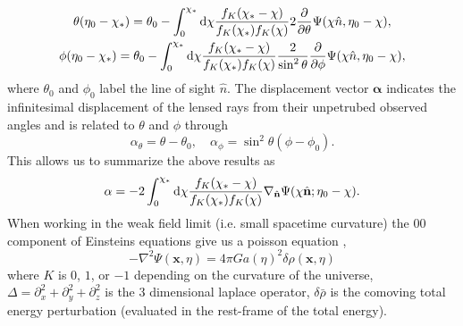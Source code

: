 \documentclass[11pt]{article} %
\DeclareRobustCommand{\d}{\ifmmode\text{d}\else d\fi}
\begin{document}
\begin{gather}
    \theta(\eta_0 - \chi_*)=\theta_0 - \int_0^{\chi_*}\d\chi\frac{f_K(\chi_* - \chi)}{f_K(\chi_*)f_K(\chi)}2\frac{\partial}{\partial \theta}\Psi(\chi\hat n, \eta_0 - \chi),\\
    \phi(\eta_0 - \chi_*)=\theta_0 - \int_0^{\chi_*}\d\chi\frac{f_K(\chi_* - \chi)}{f_K(\chi_*)f_K(\chi)}\frac{2}{\sin^2\theta}\frac{\partial}{\partial \phi}\Psi(\chi\hat n, \eta_0 - \chi),
\end{gather}
where $\theta_0$ and $\phi_0$ label the line of sight $\hat n$. The displacement vector $\mathbf{\alpha}$ indicates the infinitesimal displacement of the lensed rays from their unpetrubed observed angles and is related to $\theta$ and $\phi$ through
$$
\alpha_\theta = \theta - \theta_0, \quad \alpha_\phi = \sin^2\theta(\phi - \phi_0).
$$
This allows us to summarize the above results as
\begin{equation}
    \mathbf \alpha = -2 \int_0^{\chi_*}\d \chi \frac{f_K(\chi_* - \chi)}{f_K(\chi_*)f_K(\chi)}\nabla_{\hat{\mathbf n}}\Psi(\chi\hat{\mathbf n};\eta_0 - \chi).
\end{equation}
When working in the weak field limit (i.e. small spacetime curvature) the $00$ component of Einsteins equations give us a poisson equation \cite{dodelson2020modern},
\begin{equation}
    -\nabla^2\Psi(\textbf{x}, \eta) =  4\pi G a(\eta)^2\delta\rho(\mathbf x, \eta)
\end{equation}
where $K$ is $0$, $1$, or $-1$ depending on the curvature of the universe, $\Delta = \partial_x^2 + \partial_y^2 + \partial_z^2$ is the 3 dimensional laplace operator, $\delta\bar\rho$ is the comoving total energy perturbation (evaluated in the rest-frame of the total energy). %
\end{document}
